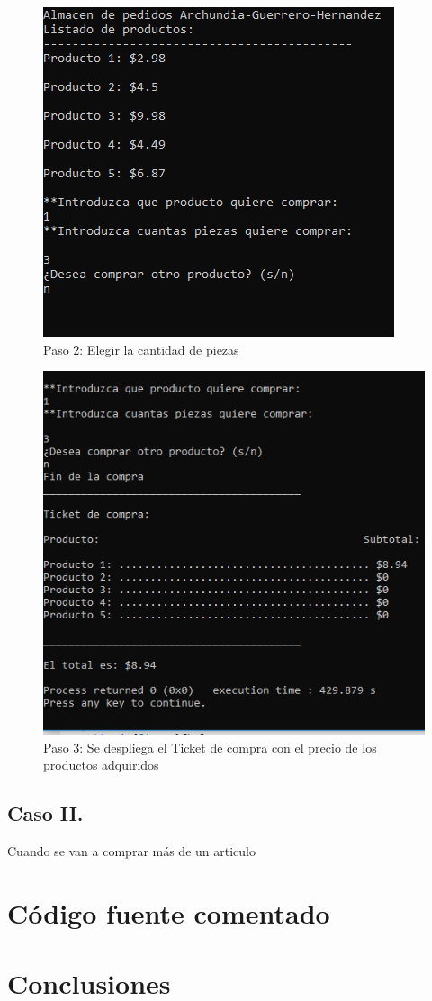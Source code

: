\documentclass[letter,twocolumn]{revtex4}
\begin{document}
   
     \begin{figure}[ht]
             \renewcommand\figurename{Fig.}
             \includegraphics[scale=0.5]{Images/Paso2.PNG}
             \caption{Paso 2: Elegir la cantidad de piezas }
     \end{figure}  
     
     
     \begin{figure}[ht]
             \renewcommand\figurename{Fig.}
             \includegraphics[scale=0.5]{Images/Paso3.PNG}
             \caption{Paso 3: Se despliega el Ticket de compra con el precio de los productos adquiridos}
     \end{figure}  

\clearpage
\subsection{Caso II.}
Cuando se van a comprar más de un articulo 

\clearpage
        
\clearpage




\section{Código fuente comentado}




\section{Conclusiones}
\end{document}
